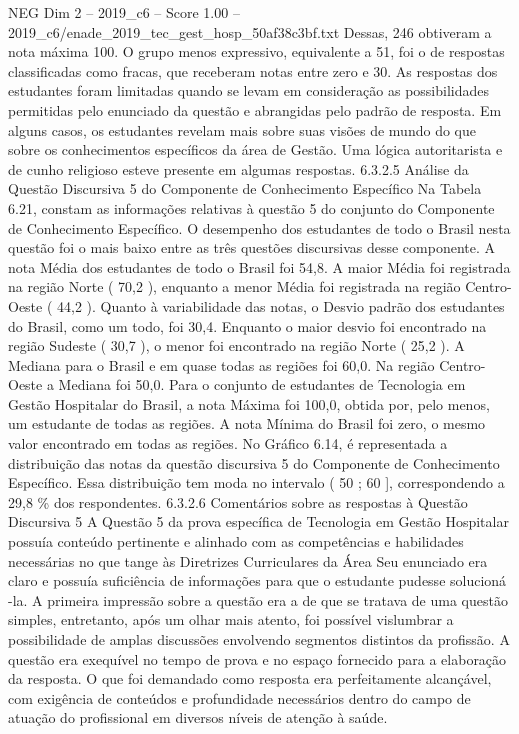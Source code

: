 \begin{textsample}{NEG Dim 2 – 2019\_c6 – Score 1.00 – 2019\_c6/enade\_2019\_tec\_gest\_hosp\_50af38c3bf.txt}
Dessas, 246 obtiveram a nota máxima 100.
O grupo menos expressivo, equivalente a 51, foi o de respostas classificadas como fracas, que receberam notas entre zero e 30.
As respostas dos estudantes foram limitadas quando se levam em consideração as possibilidades permitidas pelo enunciado da questão e abrangidas pelo padrão de resposta.
Em alguns casos, os estudantes revelam mais sobre suas visões de mundo do que sobre os conhecimentos específicos da área de Gestão.
Uma lógica autoritarista e de cunho religioso esteve presente em algumas respostas. 6.3.2.5 Análise da Questão Discursiva 5 do Componente de Conhecimento Específico Na Tabela 6.21, constam as informações relativas à questão 5 do conjunto do Componente de Conhecimento Específico.
O desempenho dos estudantes de todo o Brasil nesta questão foi o mais baixo entre as três questões discursivas desse componente.
A nota Média dos estudantes de todo o Brasil foi 54,8.
A maior Média foi registrada na região Norte ( 70,2 ), enquanto a menor Média foi registrada na região Centro-Oeste ( 44,2 ).
Quanto à variabilidade das notas, o Desvio padrão dos estudantes do Brasil, como um todo, foi 30,4.
Enquanto o maior desvio foi encontrado na região Sudeste ( 30,7 ), o menor foi encontrado na região Norte ( 25,2 ).
A Mediana para o Brasil e em quase todas as regiões foi 60,0.
Na região Centro-Oeste a Mediana foi 50,0.
Para o conjunto de estudantes de Tecnologia em Gestão Hospitalar do Brasil, a nota Máxima foi 100,0, obtida por, pelo menos, um estudante de todas as regiões.
A nota Mínima do Brasil foi zero, o mesmo valor encontrado em todas as regiões.
No Gráfico 6.14, é representada a distribuição das notas da questão discursiva 5 do Componente de Conhecimento Específico.
Essa distribuição tem moda no intervalo ( 50 ; 60 ], correspondendo a 29,8 \% dos respondentes. 6.3.2.6 Comentários sobre as respostas à Questão Discursiva 5 A Questão 5 da prova específica de Tecnologia em Gestão Hospitalar possuía conteúdo pertinente e alinhado com as competências e habilidades necessárias no que tange às Diretrizes Curriculares da Área Seu enunciado era claro e possuía suficiência de informações para que o estudante pudesse solucioná -la.
A primeira impressão sobre a questão era a de que se tratava de uma questão simples, entretanto, após um olhar mais atento, foi possível vislumbrar a possibilidade de amplas discussões envolvendo segmentos distintos da profissão.
A questão era exequível no tempo de prova e no espaço fornecido para a elaboração da resposta.
O que foi demandado como resposta era perfeitamente alcançável, com exigência de conteúdos e profundidade necessários dentro do campo de atuação do profissional em diversos níveis de atenção à saúde.

\end{textsample}
